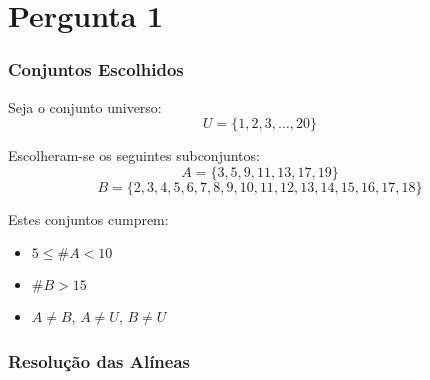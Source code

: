 \chapter{Pergunta 1}

\subsection*{Conjuntos Escolhidos}

Seja o conjunto universo:
\[
U = \{1, 2, 3, \ldots, 20\}
\]

Escolheram-se os seguintes subconjuntos:
\[
A = \{3, 5, 9, 11, 13, 17, 19\}
\]
\[
B = \{2, 3, 4, 5, 6, 7, 8, 9, 10, 11, 12, 13, 14, 15, 16, 17, 18\}
\]

Estes conjuntos cumprem:
\begin{itemize}
    \item \(5 \leq \#A < 10\)
    \item \(\#B > 15\)
    \item \(A \neq B\), \(A \neq U\), \(B \neq U\)
\end{itemize}

\newpage
\subsection*{Resolução das Alíneas}

